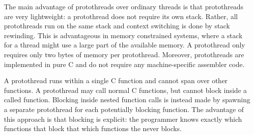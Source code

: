 The main advantage of protothreads over ordinary threads is that protothreads are very lightweight\+: a protothread does not require its own stack. Rather, all protothreads run on the same stack and context switching is done by stack rewinding. This is advantageous in memory constrained systems, where a stack for a thread might use a large part of the available memory. A protothread only requires only two bytes of memory per protothread. Moreover, protothreads are implemented in pure C and do not require any machine-\/specific assembler code.

A protothread runs within a single C function and cannot span over other functions. A protothread may call normal C functions, but cannot block inside a called function. Blocking inside nested function calls is instead made by spawning a separate protothread for each potentially blocking function. The advantage of this approach is that blocking is explicit\+: the programmer knows exactly which functions that block that which functions the never blocks.

